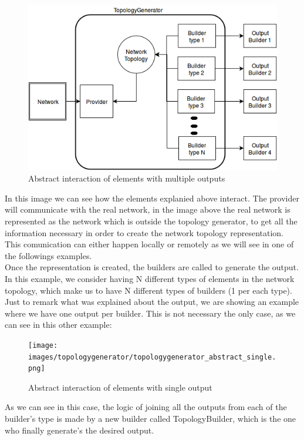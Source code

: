 \begin{figure}[H]
\centering
\includegraphics[width=\textwidth]{images/topologygenerator/topologygenerator_abstract_multiple.png}
\caption{Abstract interaction of elements with multiple outputs}
\end{figure}

In this image we can see how the elements explanied above interact. The provider will communicate with the real network, in the image above the real network is represented as the network which is outside the topology generator, to get all the information necessary in order to create the network topology representation. This comunication can either happen locally or remotely as we will see in one of the followings examples.\\
Once the representation is created, the builders are called to generate the output. In this example, we consider having N different types of elements in the network topology, which make us to have N different types of builders (1 per each type). Just to remark what was explained about the output, we are showing an example where we have one output per builder. This is not necessary the only case, as we can see in this other example: 

\begin{figure}[H]
\centering
\texttt{[image: images/topologygenerator/topologygenerator\_abstract\_single.png]}
\caption{Abstract interaction of elements with single output}
\end{figure}

As we can see in this case, the logic of joining all the outputs from each of the builder's type is made by a new builder called TopologyBuilder, which is the one who finally generate's the desired output.\\

